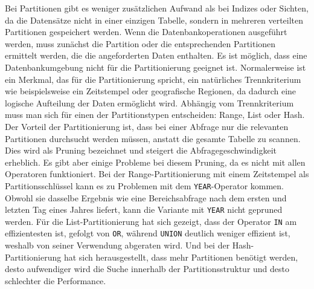 Bei Partitionen gibt es weniger zusätzlichen Aufwand als bei Indizes oder Sichten, da die Datensätze nicht in einer einzigen Tabelle, sondern in mehreren verteilten Partitionen gespeichert werden.
Wenn die Datenbankoperationen ausgeführt werden, muss zunächst die Partition oder die entsprechenden Partitionen ermittelt werden, die die angeforderten Daten enthalten.
Es ist möglich, dass eine Datenbankumgebung nicht für die Partitionierung geeignet ist.
Normalerweise ist ein Merkmal, das für die Partitionierung spricht, ein natürliches Trennkriterium wie beispielsweise ein Zeitstempel oder geografische Regionen, da dadurch eine logische Aufteilung der Daten ermöglicht wird.
Abhängig vom Trennkriterium muss man sich für einen der Partitionstypen entscheiden: Range, List oder Hash.
Der Vorteil der Partitionierung ist, dass bei einer Abfrage nur die relevanten Partitionen durchsucht werden müssen, anstatt die gesamte Tabelle zu scannen.
Dies wird als Pruning bezeichnet und steigert die Abfragegeschwindigkeit erheblich.
Es gibt aber einige Probleme bei diesem Pruning, da es nicht mit allen Operatoren funktioniert.
Bei der Range-Partitionierung mit einem Zeitstempel als Partitionsschlüssel kann es zu Problemen mit dem \texttt{YEAR}-Operator kommen.
Obwohl sie dasselbe Ergebnis wie eine Bereichsabfrage nach dem ersten und letzten Tag eines Jahres liefert, kann die Variante mit \texttt{YEAR} nicht gepruned werden.
Für die List-Partitionierung hat sich gezeigt, dass der Operator \texttt{IN} am effizientesten ist, gefolgt von \texttt{OR}, während \texttt{UNION} deutlich weniger effizient ist, weshalb von seiner Verwendung abgeraten wird.
Und bei der Hash-Partitionierung hat sich herausgestellt, dass mehr Partitionen benötigt werden, desto aufwendiger wird die Suche innerhalb der Partitionsstruktur und desto schlechter die Performance.

